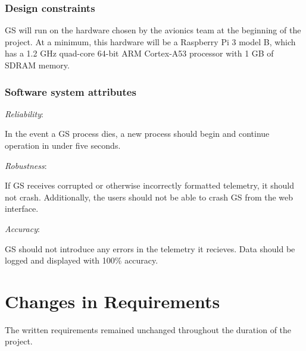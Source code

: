 \documentclass[10pt,draftclsnofoot,onecolumn]{IEEEtran}
\newcommand{\subsubsubsection}[1]{
	\hfill\break\textit{#1}:
}
\begin{document}
	\subsubsection{Design constraints}
	GS will run on the hardware chosen by the avionics team at the beginning of the project.
	At a minimum, this hardware will be a Raspberry Pi 3 model B, which has a 1.2 GHz quad-core 64-bit ARM Cortex-A53 processor
	with 1 GB of SDRAM memory.

	\subsubsection{Software system attributes}

	\subsubsubsection{Reliability}
	In the event a GS process dies, a new process should begin and continue operation in under five seconds.

	\subsubsubsection{Robustness}
	If GS receives corrupted or otherwise incorrectly formatted telemetry, it should not crash.
	Additionally, the users should not be able to crash GS from the web interface.

	\subsubsubsection{Accuracy}
	GS should not introduce any errors in the telemetry it recieves.
	Data should be logged and displayed with 100\% accuracy.



































\newpage
\section{Changes in Requirements}
The written requirements remained unchanged throughout the duration of the project.
\end{document}
